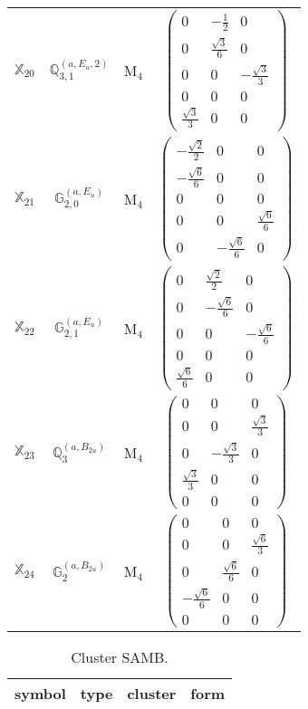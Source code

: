 \documentclass[fleqn,10pt,landscape]{article}
\begin{document}
\begin{itemize}
\begin{center}
\begin{longtable}{c|c|c|c}
$ \mathbb{X}_{20} $ & $\mathbb{Q}_{3,1}^{(a,E_{u},2)}$ & M$_{4}$ & $\begin{pmatrix} 0 & - \frac{1}{2} & 0 \\ 0 & \frac{\sqrt{3}}{6} & 0 \\ 0 & 0 & - \frac{\sqrt{3}}{3} \\ 0 & 0 & 0 \\ \frac{\sqrt{3}}{3} & 0 & 0 \end{pmatrix}$ \\
$ \mathbb{X}_{21} $ & $\mathbb{G}_{2,0}^{(a,E_{u})}$ & M$_{4}$ & $\begin{pmatrix} - \frac{\sqrt{2}}{2} & 0 & 0 \\ - \frac{\sqrt{6}}{6} & 0 & 0 \\ 0 & 0 & 0 \\ 0 & 0 & \frac{\sqrt{6}}{6} \\ 0 & - \frac{\sqrt{6}}{6} & 0 \end{pmatrix}$ \\
$ \mathbb{X}_{22} $ & $\mathbb{G}_{2,1}^{(a,E_{u})}$ & M$_{4}$ & $\begin{pmatrix} 0 & \frac{\sqrt{2}}{2} & 0 \\ 0 & - \frac{\sqrt{6}}{6} & 0 \\ 0 & 0 & - \frac{\sqrt{6}}{6} \\ 0 & 0 & 0 \\ \frac{\sqrt{6}}{6} & 0 & 0 \end{pmatrix}$ \\
$ \mathbb{X}_{23} $ & $\mathbb{Q}_{3}^{(a,B_{2u})}$ & M$_{4}$ & $\begin{pmatrix} 0 & 0 & 0 \\ 0 & 0 & \frac{\sqrt{3}}{3} \\ 0 & - \frac{\sqrt{3}}{3} & 0 \\ \frac{\sqrt{3}}{3} & 0 & 0 \\ 0 & 0 & 0 \end{pmatrix}$ \\
$ \mathbb{X}_{24} $ & $\mathbb{G}_{2}^{(a,B_{2u})}$ & M$_{4}$ & $\begin{pmatrix} 0 & 0 & 0 \\ 0 & 0 & \frac{\sqrt{6}}{3} \\ 0 & \frac{\sqrt{6}}{6} & 0 \\ - \frac{\sqrt{6}}{6} & 0 & 0 \\ 0 & 0 & 0 \end{pmatrix}$ \\
\end{longtable}
\end{center}
\begin{center}
\renewcommand{\arraystretch}{1.3}
\begin{longtable}{c|c|c|c}
\caption{Cluster SAMB.}
 \\
 \hline \hline
symbol & type & cluster & form \\ \hline \endfirsthead


\end{longtable}
\end{center}
\end{itemize}
\end{document}
